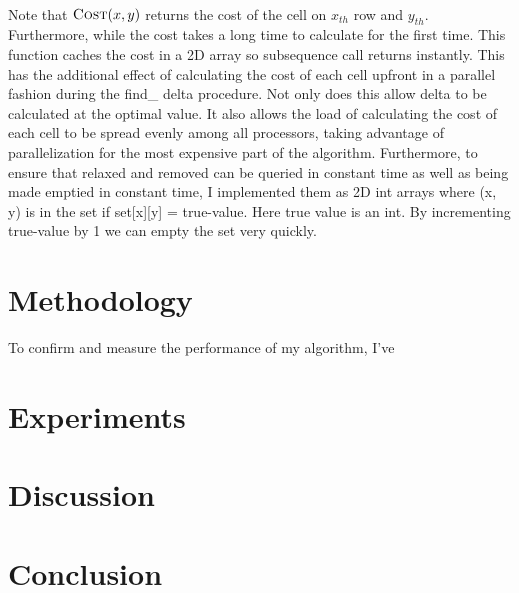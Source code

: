 \documentclass{article}
\begin{document}
\\
Note that \(\Call{Cost}{x, y}\) returns the cost of the cell on \(x_{th}\) row and \(y_{th}\).
Furthermore, while the cost takes a long time to calculate for the first time. This function caches
the cost in a 2D array so subsequence call returns instantly. This has the additional effect of
calculating the cost of each cell upfront in a parallel fashion during the find\_ delta procedure.
Not only does this allow delta to be calculated at the optimal value. It also allows the load of
calculating the cost of each cell to be spread evenly among all processors, taking advantage of
parallelization for the most expensive part of the algorithm.
Furthermore, to ensure that relaxed and removed can be queried in constant time as well as being
made emptied in constant time, I implemented them as 2D int arrays where (x, y) is in the set if
set[x][y] = true-value. Here true value is an int. By incrementing true-value by 1 we can empty
the set very quickly.

\section*{Methodology}
To confirm and measure the performance of my algorithm, I've 

\section*{Experiments}
\section*{Discussion}
\section*{Conclusion}

\printbibliography
\end{document}
